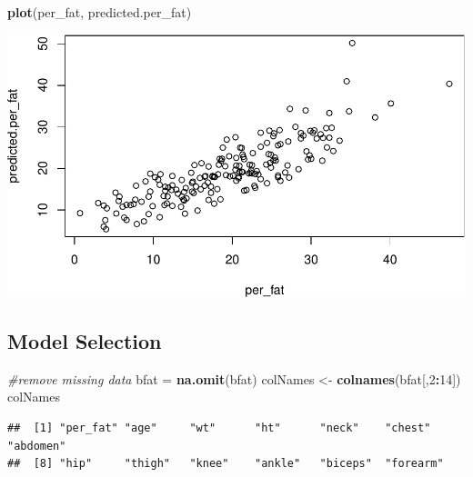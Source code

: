 \documentclass[]{article}
\newenvironment{Shaded}{\begin{snugshade}}{\end{snugshade}}
\newcommand{\KeywordTok}[1]{\textcolor[rgb]{0.13,0.29,0.53}{\textbf{#1}}}
\newcommand{\DecValTok}[1]{\textcolor[rgb]{0.00,0.00,0.81}{#1}}
\newcommand{\StringTok}[1]{\textcolor[rgb]{0.31,0.60,0.02}{#1}}
\newcommand{\CommentTok}[1]{\textcolor[rgb]{0.56,0.35,0.01}{\textit{#1}}}
\newcommand{\OperatorTok}[1]{\textcolor[rgb]{0.81,0.36,0.00}{\textbf{#1}}}
\newcommand{\NormalTok}[1]{#1}
\begin{document}
\begin{Shaded}
\begin{Highlighting}[]
\KeywordTok{plot}\NormalTok{(per_fat, predicted.per_fat)}
\end{Highlighting}
\end{Shaded}

\includegraphics{BodyFat_files/figure-latex/unnamed-chunk-10-2.pdf}

\subsection{Model Selection}\label{model-selection}

\begin{Shaded}
\begin{Highlighting}[]
\CommentTok{#remove missing data}
\NormalTok{bfat =}\StringTok{ }\KeywordTok{na.omit}\NormalTok{(bfat)}
\NormalTok{colNames <-}\StringTok{ }\KeywordTok{colnames}\NormalTok{(bfat[,}\DecValTok{2}\OperatorTok{:}\DecValTok{14}\NormalTok{])}
\NormalTok{colNames}
\end{Highlighting}
\end{Shaded}

\begin{verbatim}
##  [1] "per_fat" "age"     "wt"      "ht"      "neck"    "chest"   "abdomen"
##  [8] "hip"     "thigh"   "knee"    "ankle"   "biceps"  "forearm"
\end{verbatim}
\end{document}
